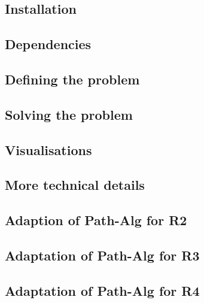 \documentclass[article]{jss}
\begin{document}
\subsection{Installation}\label{sec:installation}

\subsection{Dependencies}\label{Dependencies}

\subsection{Defining the problem}\label{sec:problem}

\subsection{Solving the problem}\label{sec:solve}

\subsection{Visualisations}\label{sec:visualisations}



\newpage





\begin{appendix}

\section{More technical details} \label{app:technical}


\subsection{Adaption of Path-Alg for R2} \label{sec:PA-R2}
\subsection{Adaptation of Path-Alg for R3} \label{sec:PA-R3}
\subsection{Adaptation of Path-Alg for R4} \label{sec:PA-R4}




\end{appendix}
\end{document}
